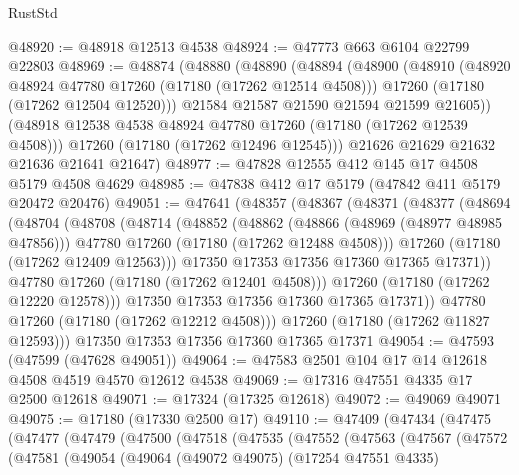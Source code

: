 \begin{lexlean}{RustStd}
\begin{coremodule}
{\begin{coremodule}
{{{{{{{{{{{{{{{{{{{{{{{{{{{{{{{{{{{{{{{{{{{{{{{{{{{{{{{@48920 := @48918 @12513 @4538
@48924 := @47773 @663 @6104 @22799 @22803
@48969 := @48874
    (@48880
      (@48890
        (@48894
          (@48900
            (@48910
              (@48920 @48924 @47780 @17260 (@17180 (@17262 @12514 @4508)))
              @17260
              (@17180 (@17262 @12504 @12520)))
            @21584
            @21587
            @21590
            @21594
            @21599
            @21605))
        (@48918 @12538 @4538 @48924 @47780 @17260 (@17180 (@17262 @12539 @4508)))
        @17260
        (@17180 (@17262 @12496 @12545)))
      @21626
      @21629
      @21632
      @21636
      @21641
      @21647)
@48977 := @47828 @12555 @412 @145 @17 @4508 @5179 @4508 @4629
@48985 := @47838 @412 @17 @5179 (@47842 @411 @5179 @20472 @20476)
@49051 := @47641
    (@48357
      (@48367
        (@48371
          (@48377
            (@48694
              (@48704
                (@48708
                  (@48714
                    (@48852
                      (@48862
                        (@48866 (@48969 (@48977 @48985 @47856)))
                        @47780
                        @17260
                        (@17180 (@17262 @12488 @4508)))
                      @17260
                      (@17180 (@17262 @12409 @12563)))
                    @17350
                    @17353
                    @17356
                    @17360
                    @17365
                    @17371))
                @47780
                @17260
                (@17180 (@17262 @12401 @4508)))
              @17260
              (@17180 (@17262 @12220 @12578)))
            @17350
            @17353
            @17356
            @17360
            @17365
            @17371))
        @47780
        @17260
        (@17180 (@17262 @12212 @4508)))
      @17260
      (@17180 (@17262 @11827 @12593)))
    @17350
    @17353
    @17356
    @17360
    @17365
    @17371
@49054 := @47593 (@47599 (@47628 @49051))
@49064 := @47583 @2501 @104 @17 @14 @12618 @4508 @4519 @4570 @12612 @4538
@49069 := @17316 @47551 @4335 @17 @2500 @12618
@49071 := @17324 (@17325 @12618)
@49072 := @49069 @49071
@49075 := @17180 (@17330 @2500 @17)
@49110 := @47409
    (@47434
      (@47475
        (@47477
          (@47479
            (@47500
              (@47518
                (@47535
                  (@47552
                    (@47563
                      (@47567
                        (@47572
                          (@47581
                            (@49054
                              (@49064
                                (@49072 @49075)
                                (@17254 @47551 @4335)
}}}}}}}}}}}}}}}}}}}}}}}}}}}}}}}}}}}}}}}}}}}}}}}}}}}}}}}
\end{coremodule}}
\end{coremodule}
\end{lexlean}
